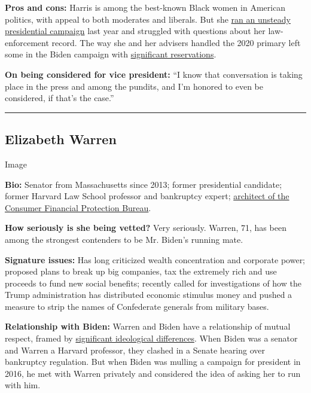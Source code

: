 \textbf{Pros and cons:} Harris is among the best-known Black women in
American politics, with appeal to both moderates and liberals. But she
\href{https://www.nytimes.com/2019/11/29/us/politics/kamala-harris-2020.html}{ran
an unsteady presidential campaign} last year and struggled with
questions about her law-enforcement record. The way she and her advisers
handled the 2020 primary left some in the Biden campaign with
\href{https://www.nytimes.com/2020/07/31/us/elections/biden-vs-trump.html}{significant
reservations}.

\textbf{On being considered for vice president:} ``I know that
conversation is taking place in the press and among the pundits, and I'm
honored to even be considered, if that's the case.''

\begin{center}\rule{0.5\linewidth}{\linethickness}\end{center}

\hypertarget{elizabeth-warren}{%
\subsection{Elizabeth Warren}\label{elizabeth-warren}}

Image

\textbf{Bio:} Senator from Massachusetts since 2013; former presidential
candidate; former Harvard Law School professor and bankruptcy expert;
\href{https://www.nytimes.com/2019/09/21/us/politics/elizabeth-warren.html}{architect
of the Consumer Financial Protection Bureau}.

\textbf{How seriously is she being vetted?} Very seriously. Warren, 71,
has been among the strongest contenders to be Mr. Biden's running mate.

\textbf{Signature issues:} Has long criticized wealth concentration and
corporate power; proposed plans to break up big companies, tax the
extremely rich and use proceeds to fund new social benefits; recently
called for investigations of how the Trump administration has
distributed economic stimulus money and pushed a measure to strip the
names of Confederate generals from military bases.

\textbf{Relationship with Biden:} Warren and Biden have a relationship
of mutual respect, framed by
\href{https://www.nytimes.com/2020/05/22/us/politics/democrats-biden-warren-ticket.html}{significant
ideological differences}. When Biden was a senator and Warren a Harvard
professor, they clashed in a Senate hearing over bankruptcy regulation.
But when Biden was mulling a campaign for president in 2016, he met with
Warren privately and considered the idea of asking her to run with him.

